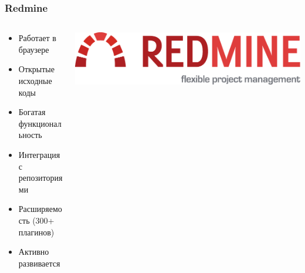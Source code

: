 \documentclass[unicode]{beamer}
\begin{document}
\begin{frame}
\transwipe[direction=90]
\frametitle{Redmine}
\begin{columns}
\begin{column}{0.6\textwidth}
\begin{itemize}
  \item Работает в браузере
  \item Открытые исходные коды
  \item Богатая функциональность
  \item Интеграция с репозиториями
  \item Расширяемость (300+ плагинов)
  \item Активно развивается
\end{itemize}
\end{column}
\begin{column}{0.4\textwidth}
\centerline{\includegraphics[width=1\textwidth]{redmine-logo.pdf}}
\end{column}
\end{columns}
\end{frame}
\end{document}
